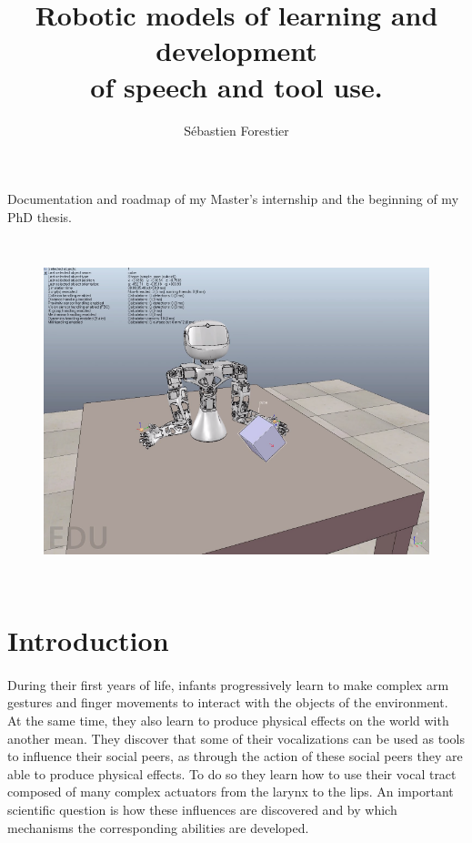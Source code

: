 \documentclass[12pt]{article}
\title{Robotic models of learning and development \\of speech and tool use.}
\author{S\'ebastien Forestier}
\begin{document}
\maketitle
\thispagestyle{empty}


\vspace{2em}

	Documentation and roadmap of my Master's internship and the beginning of my PhD thesis.

%

\vspace{2em}

	\begin{figure}[H] 
		\centering 
		\includegraphics[height=10cm]{./include/torso.png}
	\end{figure}  	


\newpage
\tableofcontents
\newpage


\section{Introduction}

	\paragraph{}
	During their first years of life, infants progressively learn to make complex arm gestures and finger movements to interact with the objects of the environment.
	At the same time, they also learn to produce physical effects on the world with another mean.
	They discover that some of their
	vocalizations can be used as tools to influence their social peers, as through the action of these social peers they are able to produce physical effects.
	To do so they learn how to use their vocal tract composed of many complex actuators from the larynx to the lips.
	An important scientific question is how these influences are discovered and by which mechanisms the corresponding abilities are developed.
\end{document}
